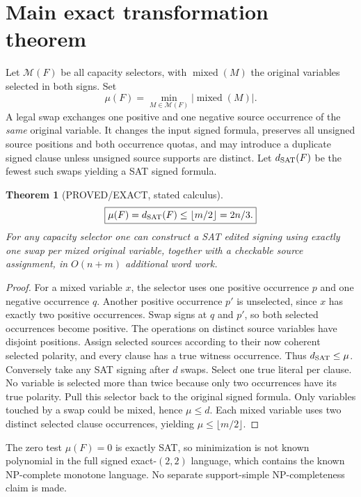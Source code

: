 \documentclass[11pt]{article}
\newtheorem{theorem}{Theorem}
\begin{document}
\section{Main exact transformation theorem}
Let $\mathcal M(F)$ be all capacity selectors, with $\operatorname{mixed}(M)$ the original variables selected in both signs. Set
\[
\mu(F)=\min_{M\in\mathcal M(F)}|\operatorname{mixed}(M)|.
\]
A legal swap exchanges one positive and one negative source occurrence of the \emph{same} original variable. It changes the input signed formula, preserves all unsigned source positions and both occurrence quotas, and may introduce a duplicate signed clause unless unsigned source supports are distinct. Let $d_{\rm SAT}(F)$ be the fewest such swaps yielding a SAT signed formula.
\begin{theorem}[PROVED/EXACT, stated calculus]
\[
\boxed{\mu(F)=d_{\rm SAT}(F)\le\lfloor m/2\rfloor=2n/3.}
\]
For any capacity selector one can construct a SAT edited signing using exactly one swap per mixed original variable, together with a checkable source assignment, in $O(n+m)$ additional word work.
\end{theorem}
\begin{proof}
For a mixed variable $x$, the selector uses one positive occurrence $p$ and one negative occurrence $q$. Another positive occurrence $p'$ is unselected, since $x$ has exactly two positive occurrences. Swap signs at $q$ and $p'$, so both selected occurrences become positive. The operations on distinct source variables have disjoint positions. Assign selected sources according to their now coherent selected polarity, and every clause has a true witness occurrence. Thus $d_{\rm SAT}\le\mu$. Conversely take any SAT signing after $d$ swaps. Select one true literal per clause. No variable is selected more than twice because only two occurrences have its true polarity. Pull this selector back to the original signed formula. Only variables touched by a swap could be mixed, hence $\mu\le d$. Each mixed variable uses two distinct selected clause occurrences, yielding $\mu\le\lfloor m/2\rfloor$.
\end{proof}
The zero test $\mu(F)=0$ is exactly SAT, so minimization is not known polynomial in the full signed exact-$(2,2)$ language, which contains the known NP-complete monotone language. No separate support-simple NP-completeness claim is made.
\end{document}
